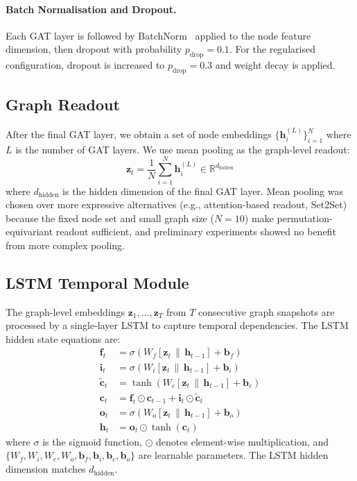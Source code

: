 \paragraph{Batch Normalisation and Dropout.}
Each GAT layer is followed by BatchNorm~\cite{goodfellow2016deep} applied to the node feature dimension, then dropout with probability $p_{\text{drop}} = 0.1$. For the regularised configuration, dropout is increased to $p_{\text{drop}} = 0.3$ and weight decay is applied.

\subsection{Graph Readout}

After the final GAT layer, we obtain a set of node embeddings $\{\mathbf{h}_i^{(L)}\}_{i=1}^{N}$ where $L$ is the number of GAT layers. We use mean pooling as the graph-level readout:
\begin{equation}
    \mathbf{z}_t = \frac{1}{N}\sum_{i=1}^{N} \mathbf{h}_i^{(L)} \in \mathbb{R}^{d_{\text{hidden}}}
    \label{eq:readout}
\end{equation}
where $d_{\text{hidden}}$ is the hidden dimension of the final GAT layer. Mean pooling was chosen over more expressive alternatives (e.g., attention-based readout, Set2Set) because the fixed node set and small graph size ($N=10$) make permutation-equivariant readout sufficient, and preliminary experiments showed no benefit from more complex pooling.

\subsection{LSTM Temporal Module}

The graph-level embeddings $\mathbf{z}_1, \ldots, \mathbf{z}_T$ from $T$ consecutive graph snapshots are processed by a single-layer LSTM to capture temporal dependencies. The LSTM hidden state equations are:
\begin{align}
    \mathbf{f}_t &= \sigma\!\left(W_f [\mathbf{z}_t \,\|\, \mathbf{h}_{t-1}] + \mathbf{b}_f\right) \label{eq:lstm-forget}\\
    \mathbf{i}_t &= \sigma\!\left(W_i [\mathbf{z}_t \,\|\, \mathbf{h}_{t-1}] + \mathbf{b}_i\right) \label{eq:lstm-input}\\
    \tilde{\mathbf{c}}_t &= \tanh\!\left(W_c [\mathbf{z}_t \,\|\, \mathbf{h}_{t-1}] + \mathbf{b}_c\right) \label{eq:lstm-candidate}\\
    \mathbf{c}_t &= \mathbf{f}_t \odot \mathbf{c}_{t-1} + \mathbf{i}_t \odot \tilde{\mathbf{c}}_t \label{eq:lstm-cell}\\
    \mathbf{o}_t &= \sigma\!\left(W_o [\mathbf{z}_t \,\|\, \mathbf{h}_{t-1}] + \mathbf{b}_o\right) \label{eq:lstm-output}\\
    \mathbf{h}_t &= \mathbf{o}_t \odot \tanh(\mathbf{c}_t) \label{eq:lstm-hidden}
\end{align}
where $\sigma$ is the sigmoid function, $\odot$ denotes element-wise multiplication, and $\{W_f, W_i, W_c, W_o, \mathbf{b}_f, \mathbf{b}_i, \mathbf{b}_c, \mathbf{b}_o\}$ are learnable parameters. The LSTM hidden dimension matches $d_{\text{hidden}}$.

